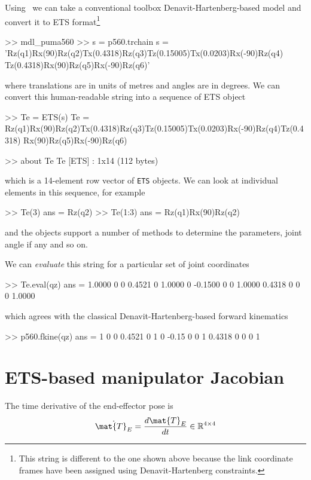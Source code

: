 \documentclass[11pt]{article}
\begin{document}
Using \MATLAB\ we can take a conventional toolbox Denavit-Hartenberg-based model and convert it to ETS format\footnote{This string is different to the one shown above because the link coordinate frames have been assigned using Denavit-Hartenberg constraints.}
\begin{Code}
>> mdl_puma560
>> s = p560.trchain
s =
    'Rz(q1)Rx(90)Rz(q2)Tx(0.4318)Rz(q3)Tz(0.15005)Tx(0.0203)Rx(-90)Rz(q4)
    Tz(0.4318)Rx(90)Rz(q5)Rx(-90)Rz(q6)'
\end{Code}
where translations are in units of metres and angles are in degrees.
We can convert this human-readable string into a sequence of ETS object
\begin{Code}
>> Te = ETS(s)
Te = 
Rz(q1)Rx(90)Rz(q2)Tx(0.4318)Rz(q3)Tz(0.15005)Tx(0.0203)Rx(-90)Rz(q4)Tz(0.4318)
  Rx(90)Rz(q5)Rx(-90)Rz(q6)

>> about Te
Te [ETS] : 1x14 (112 bytes)
\end{Code}
which is a 14-element row vector of \texttt{ETS} objects.  We can look at individual elements in this sequence, for example
\begin{Code}
>> Te(3)
ans = 
Rz(q2)
>> Te(1:3)
ans = 
Rz(q1)Rx(90)Rz(q2)
\end{Code}
and the objects support a number of methods to determine the parameters, joint angle if any and so on.

We can \textit{evaluate} this string for a particular set of joint coordinates
\begin{Code}
>> Te.eval(qz)
ans =
    1.0000         0         0    0.4521
         0    1.0000         0   -0.1500
         0         0    1.0000    0.4318
         0         0         0    1.0000
\end{Code}
which agrees with the classical Denavit-Hartenberg-based forward kinematics
\begin{Code}
>> p560.fkine(qz)
ans = 
         1         0         0    0.4521
         0         1         0     -0.15
         0         0         1    0.4318
         0         0         0         1
\end{Code}
    
\section{ETS-based manipulator Jacobian}
The time derivative of the end-effector pose is 
\begin{equation*}
\dot{\mat{T}_E} = \frac{d \mat{T}_E}{dt} \in \mathbb{R}^{4 \times 4}
\end{equation*}
\end{document}
